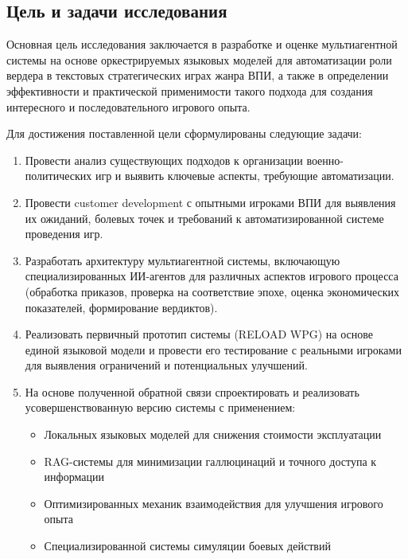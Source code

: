 \subsection*{Цель и задачи исследования}

Основная цель исследования заключается в разработке и оценке мультиагентной системы на основе оркестрируемых языковых моделей для автоматизации роли вердера в текстовых стратегических играх жанра ВПИ, а также в определении эффективности и практической применимости такого подхода для создания интересного и последовательного игрового опыта.

Для достижения поставленной цели сформулированы следующие задачи:

\begin{enumerate}
    \item Провести анализ существующих подходов к организации военно-политических игр и выявить ключевые аспекты, требующие автоматизации.

    \item Провести customer development с опытными игроками ВПИ для выявления их ожиданий, болевых точек и требований к автоматизированной системе проведения игр.

    \item Разработать архитектуру мультиагентной системы, включающую специализированных ИИ-агентов для различных аспектов игрового процесса (обработка приказов, проверка на соответствие эпохе, оценка экономических показателей, формирование вердиктов).

    \item Реализовать первичный прототип системы (RELOAD WPG) на основе единой языковой модели и провести его тестирование с реальными игроками для выявления ограничений и потенциальных улучшений.

    \item На основе полученной обратной связи спроектировать и реализовать усовершенствованную версию системы с применением:
    \begin{itemize}
        \item Локальных языковых моделей для снижения стоимости эксплуатации
        \item RAG-системы для минимизации галлюцинаций и точного доступа к информации
        \item Оптимизированных механик взаимодействия для улучшения игрового опыта
        \item Специализированной системы симуляции боевых действий
    \end{itemize}


\end{enumerate}

